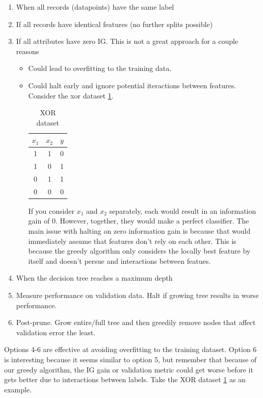 \documentclass[12pt]{article}
\begin{document}
\begin{enumerate}
	\item When all records (datapoints) have the same label
	\item If all records have identical features (no further splits possible)
	\item If all attributes have zero IG. This is not a great approach for a couple reasons
		\begin{itemize}
			\item Could lead to overfitting to the training data.
			\item Could halt early and ignore potential iteractions between features. Consider the xor dataset \ref{tab:xor_data}.
				\begin{table}[h]
					\centering
					\caption{XOR dataset} 
					\vspace{2mm}
					\label{tab:xor_data}
					\begin{tabular}{|c|c|c|}
						\hline
						$x_1$ & $x_2$ & $y$\\
						\hline
						1 & 1 & 0\\
						\hline
						1 & 0 & 1\\
						\hline
						0 & 1 & 1\\
						\hline
						0 & 0 & 0\\
						\hline
					\end{tabular}
				\end{table}
				If you consider $x_1$ and $x_2$ separately, each would result in an information gain of 0. However, together, they would make a perfect classifier. The main issue with halting on zero information gain is because that would immediately assume that features don't rely on each other. This is because the greedy algorithm only considers the locally best feature by itself and doesn't persue and interactions between featues. 
		\end{itemize}
	\item When the decision tree reaches a maximum depth
	\item Measure performance on validation data. Halt if growing tree results in worse performance.
	\item Post-prune. Grow entire/full tree and then greedily remove nodes that affect validation error the least.
\end{enumerate}

Options 4-6 are effective at avoiding overfitting to the training dataset. Option 6 is interesting because it seems similar to option 5, but remember that because of our greedy algorithm, the IG gain or validation metric could get worse before it gets better due to interactions between labels. Take the XOR dataset \ref{tab:xor_data} as an example.
\end{document}
